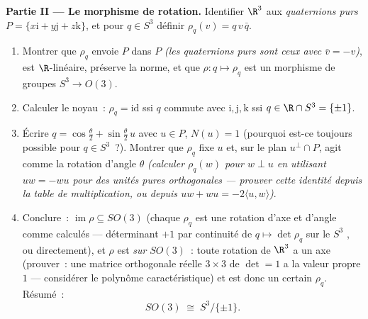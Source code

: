 \begin{problem}
\medskip
\noindent\textbf{Partie II --- Le morphisme de rotation.}
Identifier $\R^3$ aux \emph{quaternions purs} $P =
\{x\mathrm i + y\mathrm j + z\mathrm k\}$, et pour $q \in
S^3$ définir $\rho_q(v) = q\,v\,\bar q$.
\begin{enumerate}[resume]
  \item Montrer que $\rho_q$ envoie $P$ dans $P$
        \emph{(les quaternions purs sont ceux avec $\bar v =
        -v$)}, est $\R$-linéaire, préserve la norme, et que
        $\rho \colon q \mapsto \rho_q$ est un morphisme de
        groupes $S^3 \to O(3)$.
  \item Calculer le noyau~: $\rho_q = \mathrm{id}$ ssi $q$
        commute avec $\mathrm i, \mathrm j, \mathrm k$ ssi
        $q \in \R\cap S^3 = \{\pm1\}$.
  \item Écrire $q = \cos\frac\theta2 + \sin\frac\theta2\,u$
        avec $u \in P$, $N(u) = 1$ (pourquoi est-ce toujours
        possible pour $q \in S^3$~?). Montrer que $\rho_q$
        fixe $u$ et, sur le plan $u^\perp\cap P$, agit comme
        la rotation d'angle $\theta$ \emph{(calculer
        $\rho_q(w)$ pour $w \perp u$ en utilisant $uw =
        -wu$ pour des unités pures orthogonales --- prouver
        cette identité depuis la table de multiplication, ou
        depuis $uw + wu = -2\langle u, w\rangle$)}.
  \item Conclure~: $\operatorname{im}\rho \subseteq SO(3)$
        (chaque $\rho_q$ est une rotation d'axe et d'angle
        comme calculés --- déterminant $+1$ par continuité de
        $q \mapsto \det\rho_q$ sur le $S^3$ , ou
        directement), et $\rho$ est \emph{sur} $SO(3)$~:
        toute rotation de $\R^3$ a un axe (prouver~: une
        matrice orthogonale réelle $3\times3$ de $\det = 1$
        a la valeur propre $1$ --- considérer le polynôme
        caractéristique) et est donc un certain $\rho_q$.
        Résumé~:
        \[
        SO(3) \;\cong\; S^3/\{\pm 1\} .
        \]
\end{enumerate}


\end{problem}
